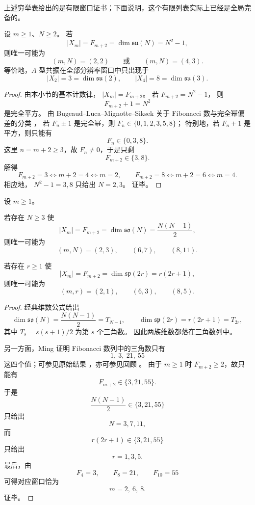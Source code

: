 上述穷举表给出的是有限窗口证书；下面说明，这个有限列表实际上已经是全局完备的。

\begin{theorem}\label{thm:fib-lie-resonance-global-a-type}
设 \(m\ge 1\)、\(N\ge 2\)。
若
\[
|X_m|=F_{m+2}=\dim\mathfrak{su}(N)=N^2-1,
\]
则唯一可能为
\[
(m,N)=(2,2)
\qquad\text{或}\qquad
(m,N)=(4,3).
\]
等价地，\(A\) 型共振在全部分辨率窗口中只出现于
\[
|X_2|=3=\dim\mathfrak{su}(2),
\qquad
|X_4|=8=\dim\mathfrak{su}(3).
\]
\end{theorem}
\begin{proof}
由本小节的基本计数律，
\(
|X_m|=F_{m+2}
\)。
若
\(
F_{m+2}=N^2-1
\)，
则
\[
F_{m+2}+1=N^2
\]
是完全平方。
由 Bugeaud--Luca--Mignotte--Siksek 关于 Fibonacci 数与完全幂偏差的分类 \cite{BugeaudLucaMignotteSiksek2008FibonacciPerfectPowerGap}，
若 \(F_n\pm 1\) 是完全幂，则 \(F_n\in\{0,1,2,3,5,8\}\)；
特别地，若 \(F_n+1\) 是平方，则只能有
\[
F_n\in\{0,3,8\}.
\]
这里 \(n=m+2\ge 3\)，故 \(F_n\neq 0\)，于是只剩
\[
F_{m+2}\in\{3,8\}.
\]
解得
\[
F_{m+2}=3 \iff m+2=4 \iff m=2,
\qquad
F_{m+2}=8 \iff m+2=6 \iff m=4.
\]
相应地，
\(
N^2-1=3,8
\)
只给出
\(
N=2,3
\)。
证毕。
\end{proof}

\begin{theorem}[正交/辛型共振的全局完备性]\label{thm:fib-lie-resonance-global-orthogonal-symplectic}
设 \(m\ge 1\)。

若存在 \(N\ge 3\) 使
\[
|X_m|=F_{m+2}=\dim\mathfrak{so}(N)=\frac{N(N-1)}{2},
\]
则唯一可能为
\[
(m,N)=(2,3),\qquad (6,7),\qquad (8,11).
\]

若存在 \(r\ge 1\) 使
\[
|X_m|=F_{m+2}=\dim\mathfrak{sp}(2r)=r(2r+1),
\]
则唯一可能为
\[
(m,r)=(2,1),\qquad (6,3),\qquad (8,5).
\]
\end{theorem}
\begin{proof}
经典维数公式给出
\[
\dim\mathfrak{so}(N)=\frac{N(N-1)}{2}=T_{N-1},
\qquad
\dim\mathfrak{sp}(2r)=r(2r+1)=T_{2r},
\]
其中 \(T_s=s(s+1)/2\) 为第 \(s\) 个三角数。
因此两族维数都落在三角数列中。

另一方面，Ming 证明 Fibonacci 数列中的三角数只有
\[
1,\ 3,\ 21,\ 55
\]
这四个值；可参见原始结果 \cite{Ming1989TriangularFibonacci}，亦可参见回顾 \cite{McDaniel1996TriangularPell}。
由于 \(m\ge 1\) 时 \(F_{m+2}\ge 2\)，故只能有
\[
F_{m+2}\in\{3,21,55\}.
\]
于是
\[
\frac{N(N-1)}{2}\in\{3,21,55\}
\]
只给出
\[
N=3,7,11,
\]
而
\[
r(2r+1)\in\{3,21,55\}
\]
只给出
\[
r=1,3,5.
\]
最后，由
\[
F_4=3,\qquad F_8=21,\qquad F_{10}=55
\]
可得对应窗口恰为
\[
m=2,\ 6,\ 8.
\]
证毕。
\end{proof}


